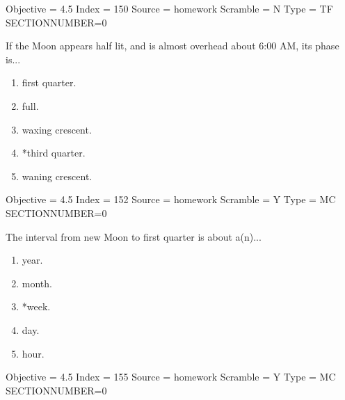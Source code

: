 \documentclass[11pt]{article}
\begin{document}
\begin{enumerate}
\begin{minipage}{\textwidth}
\begin{minipage}{\textwidth}
Objective = 4.5
Index = 150
Source = homework
Scramble = N
Type = TF
SECTIONNUMBER=0
\end{minipage}
\end{minipage}
\vskip 0.20in

\begin{minipage}{\textwidth}
\begin{minipage}{\textwidth}
\item If the Moon appears half lit, and is almost overhead about 6:00 AM, its phase is...
\begin{multicols}{3}
\begin{enumerate} 
\setlength{\itemsep}{1pt} 
\setlength{\parskip}{0pt} 
\setlength{\parsep}{0pt}
\setlength{\multicolsep}{1pt} 
\item first quarter.
\item full.
\item waxing crescent.
\item *third quarter.
\item waning crescent.
\end{enumerate} 
\vfill 
\end{multicols}

Objective = 4.5
Index = 152
Source = homework
Scramble = Y
Type = MC
SECTIONNUMBER=0
\end{minipage}
\end{minipage}
\vskip 0.20in

\begin{minipage}{\textwidth}
\begin{minipage}{\textwidth}
\item The interval from new Moon to first quarter is about a(n)...
\begin{multicols}{3}
\begin{enumerate} 
\setlength{\itemsep}{1pt} 
\setlength{\parskip}{0pt} 
\setlength{\parsep}{0pt}
\setlength{\multicolsep}{1pt} 
\item year.
\item month.
\item *week.
\item day.
\item hour.
\end{enumerate} 
\vfill 
\end{multicols}

Objective = 4.5
Index = 155
Source = homework
Scramble = Y
Type = MC
SECTIONNUMBER=0
\end{minipage}
\end{minipage}
\vskip 0.20in


\end{enumerate}
\end{document}
